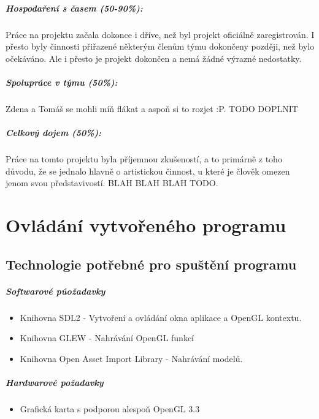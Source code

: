 \documentclass[12pt,a4paper,titlepage,final]{report}
\begin{document}
\paragraph{Hospodaření s časem (50-90\%):} Práce na projektu začala dokonce i dříve, než byl projekt oficiálně zaregistrován. I přesto byly činnosti přiřazené některým členům týmu dokončeny později, než bylo očekáváno. Ale i přesto je projekt dokončen a nemá žádné výrazné nedostatky.

\paragraph{Spolupráce v týmu (50\%):} Zdena a Tomáš se mohli míň flákat a aspoň si to rozjet :P. TODO DOPLNIT

\paragraph{Celkový dojem (50\%):} Práce na tomto projektu byla příjemnou zkušeností, a to primárně z toho důvodu, že se jednalo hlavně o artistickou činnost, u které je člověk omezen jenom svou představivostí. BLAH BLAH BLAH TODO.

\chapter{Ovládání vytvořeného programu}

\section{Technologie potřebné pro spuštění programu}
\paragraph{Softwarové púožadavky}
\begin{itemize}
	\item Knihovna SDL2 - Vytvoření a ovládání okna aplikace a OpenGL kontextu.
	\item Knihovna GLEW - Nahrávání OpenGL funkcí
	\item Knihovna Open Asset Import Library - Nahrávání modelů.
\end{itemize}

\paragraph{Hardwarové požadavky}
\begin{itemize}
	\item Grafická karta s podporou alespoň OpenGL 3.3
\end{itemize}
\end{document}
